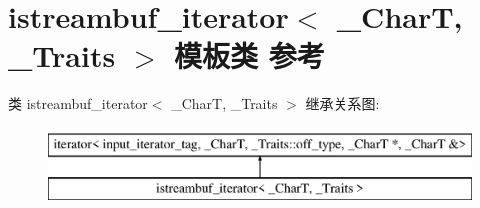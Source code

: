\hypertarget{classistreambuf__iterator}{}\section{istreambuf\+\_\+iterator$<$ \+\_\+\+CharT, \+\_\+\+Traits $>$ 模板类 参考}
\label{classistreambuf__iterator}
类 istreambuf\+\_\+iterator$<$ \+\_\+\+CharT, \+\_\+\+Traits $>$ 继承关系图\+:\begin{figure}[H]
\begin{center}
\leavevmode
\includegraphics[height=2.000000cm]{classistreambuf__iterator}
\end{center}
\end{figure}
